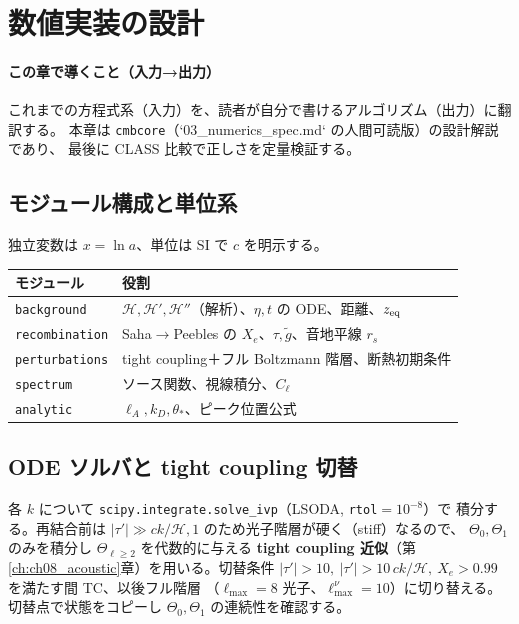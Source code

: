 \section{数値実装の設計}
\label{ch:ch14_numerics}

\paragraph{この章で導くこと（入力→出力）}
これまでの方程式系（入力）を、読者が自分で書けるアルゴリズム（出力）に翻訳する。
本章は \texttt{cmbcore}（`03\_numerics\_spec.md` の人間可読版）の設計解説であり、
最後に CLASS 比較で正しさを定量検証する。

\subsection{モジュール構成と単位系}
独立変数は $x=\ln a$、単位は SI で $c$ を明示する。
\begin{center}
\begin{tabular}{ll}
\hline
モジュール & 役割 \\
\hline
\texttt{background} & $\mathcal H,\mathcal H',\mathcal H''$（解析）、$\eta,t$ の ODE、距離、$z_{\rm eq}$ \\
\texttt{recombination} & Saha$\to$Peebles の $X_e$、$\tau,\tilde g$、音地平線 $r_s$ \\
\texttt{perturbations} & tight coupling＋フル Boltzmann 階層、断熱初期条件 \\
\texttt{spectrum} & ソース関数、視線積分、$C_\ell$ \\
\texttt{analytic} & $\ell_A,k_D,\theta_*$、ピーク位置公式 \\
\hline
\end{tabular}
\end{center}

\subsection{ODE ソルバと tight coupling 切替}
各 $k$ について \texttt{scipy.integrate.solve\_ivp}（LSODA, \texttt{rtol}$=10^{-8}$）で
積分する。再結合前は $|\tau'|\gg ck/\mathcal H,1$ のため光子階層が硬く（stiff）なるので、
$\Theta_0,\Theta_1$ のみを積分し $\Theta_{\ell\ge2}$ を代数的に与える
\textbf{tight coupling 近似}（第\ref{ch:ch08_acoustic}章）を用いる。切替条件
$|\tau'|>10,\ |\tau'|>10\,ck/\mathcal H,\ X_e>0.99$ を満たす間 TC、以後フル階層
（$\ell_{\max}=8$ 光子、$\ell_{\max}^\nu=10$）に切り替える。切替点で状態をコピーし
$\Theta_0,\Theta_1$ の連続性を確認する。


